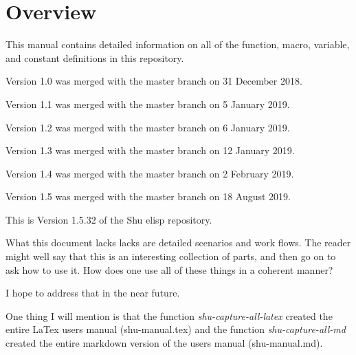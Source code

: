 


\section{Overview}


This manual contains detailed information on all of the function, macro,
variable, and constant definitions in this repository.

Version 1.0 was merged with the master branch on 31 December 2018.

Version 1.1 was merged with the master branch on 5 January 2019.

Version 1.2 was merged with the master branch on 6 January 2019.

Version 1.3 was merged with the master branch on 12 January 2019.

Version 1.4 was merged with the master branch on 2 February 2019.

Version 1.5 was merged with the master branch on 18 August 2019.

This is Version 1.5.32 of the Shu elisp repository.

What this document lacks lacks are detailed scenarios and work flows.  The
reader might well say that this is an interesting collection of parts, and
then go on to ask how to use it.  How does one use all of these things in a
coherent manner?

I hope to address that in the near future.

One thing I will mention is that the function \emph{shu-capture-all-latex} created
the entire LaTex users manual (shu-manual.tex) and the function
\emph{shu-capture-all-md} created the entire markdown version of the users manual
(shu-manual.md).


